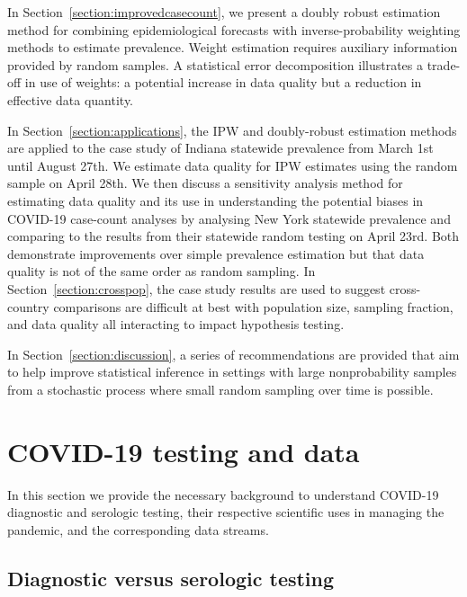 \documentclass[11pt]{amsart}
\begin{document}
In Section~\ref{section:improvedcasecount}, we present a doubly robust estimation method for combining epidemiological forecasts with inverse-probability weighting methods to estimate prevalence.  Weight estimation requires auxiliary information provided by random samples.  A statistical error decomposition illustrates a trade-off in use of weights: a potential increase in data quality but a reduction in effective data quantity.

In Section~\ref{section:applications}, the IPW and doubly-robust estimation methods are applied to the case study of Indiana statewide prevalence from March 1st until August 27th.  We estimate data quality for IPW estimates using the random sample on April 28th.  We then discuss a sensitivity analysis method for estimating data quality and its use in understanding the potential biases in COVID-19 case-count analyses by analysing New York statewide prevalence and comparing to the results from their statewide random testing on April 23rd.  Both demonstrate improvements over simple prevalence estimation but that data quality is not of the same order as random sampling.  In Section~\ref{section:crosspop}, the case study results are used to suggest cross-country comparisons are difficult at best with population size, sampling fraction, and data quality all interacting to impact hypothesis testing.

In Section~\ref{section:discussion}, a series of recommendations are provided that aim to help improve statistical inference in settings with large nonprobability samples from a stochastic process where small random sampling over time is possible.

\section{COVID-19 testing and data}
\label{section:data}

In this section we provide the necessary background to understand COVID-19 diagnostic and serologic testing, their respective scientific uses in managing the pandemic, and the corresponding data streams.

\subsection{Diagnostic versus serologic testing}
\label{section:testinginfo}

\end{document}
